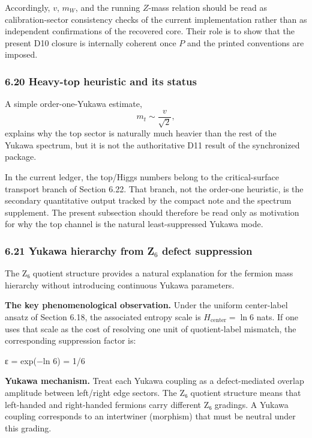 Accordingly, \(v\), \(m_W\), and the running \(Z\)-mass relation should be read as calibration-sector consistency checks of the current implementation rather than as independent confirmations of the recovered core. Their role is to show that the present D10 closure is internally coherent once \(P\) and the printed conventions are imposed.

\subsubsection{6.20 Heavy-top heuristic and its status}\label{620-top-quark-mass-from-order-one-yukawa}

A simple order-one-Yukawa estimate,
\[
m_t\sim \frac{v}{\sqrt 2},
\]
explains why the top sector is naturally much heavier than the rest of the Yukawa spectrum, but it is not the authoritative D11 result of the synchronized package.

In the current ledger, the top/Higgs numbers belong to the critical-surface transport branch of Section 6.22. That branch, not the order-one heuristic, is the secondary quantitative output tracked by the compact note and the spectrum supplement. The present subsection should therefore be read only as motivation for why the top channel is the natural least-suppressed Yukawa mode.

\subsubsection{6.21 Yukawa hierarchy from Z$_6$ defect suppression}\label{621-yukawa-hierarchy-from-zux2086-defect-suppression}

The Z₆ quotient structure provides a natural explanation for the fermion mass hierarchy without introducing continuous Yukawa parameters.

\textbf{The key phenomenological observation.} Under the uniform center-label ansatz of Section 6.18, the associated entropy scale is \(H_{\mathrm{center}} = \ln 6\) nats. If one uses that scale as the cost of resolving one unit of quotient-label mismatch, the corresponding suppression factor is:

ε = exp(−ln 6) = 1/6

\textbf{Yukawa mechanism.} Treat each Yukawa coupling as a defect-mediated overlap amplitude between left/right edge sectors. The Z₆ quotient structure means that left-handed and right-handed fermions carry different Z₆ gradings. A Yukawa coupling corresponds to an intertwiner (morphism) that must be neutral under this grading.

